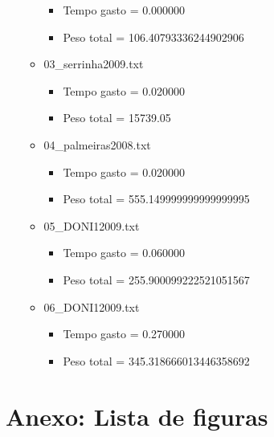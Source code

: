 \documentclass[12pt,a4paper]{article}
\begin{document}
\begin{itemize}
\begin{itemize}
\begin{itemize}
\item Tempo gasto = 0.000000
\item Peso total = 106.40793336244902906
\end{itemize}
\item 03\_serrinha2009.txt
\begin{itemize}
\item Tempo gasto = 0.020000
\item Peso total = 15739.05
\end{itemize}
\item 04\_palmeiras2008.txt
\begin{itemize}
\item Tempo gasto = 0.020000
\item Peso total = 555.149999999999999995
\end{itemize}
\item 05\_DONI12009.txt
\begin{itemize}
\item Tempo gasto = 0.060000
\item Peso total = 255.900099222521051567
\end{itemize}
\item 06\_DONI12009.txt
\begin{itemize}
\item Tempo gasto = 0.270000
\item Peso total = 345.318666013446358692
\end{itemize}
\end{itemize}
\end{itemize}

%
%



\section{Anexo: Lista de figuras}

\end{document}
